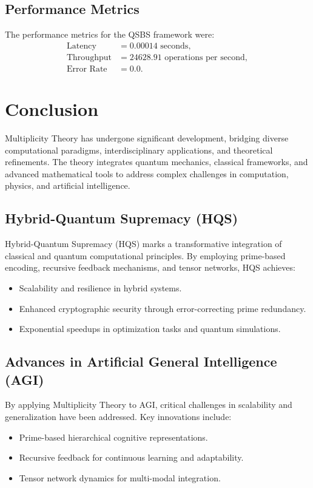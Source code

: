 \documentclass{article}
\theoremstyle{plain}
\begin{document}
\subsection{Performance Metrics}
The performance metrics for the QSBS framework were:
\begin{align*}
\text{Latency} &= 0.00014 \text{ seconds}, \\
\text{Throughput} &= 24628.91 \text{ operations per second}, \\
\text{Error Rate} &= 0.0.
\end{align*}

\section{Conclusion}
Multiplicity Theory has undergone significant development, bridging diverse computational paradigms, interdisciplinary applications, and theoretical refinements. The theory integrates quantum mechanics, classical frameworks, and advanced mathematical tools to address complex challenges in computation, physics, and artificial intelligence.

\subsection{Hybrid-Quantum Supremacy (HQS)}
Hybrid-Quantum Supremacy (HQS) marks a transformative integration of classical and quantum computational principles. By employing prime-based encoding, recursive feedback mechanisms, and tensor networks, HQS achieves:
\begin{itemize}
    \item Scalability and resilience in hybrid systems.
    \item Enhanced cryptographic security through error-correcting prime redundancy.
    \item Exponential speedups in optimization tasks and quantum simulations.
\end{itemize}

\subsection{Advances in Artificial General Intelligence (AGI)}
By applying Multiplicity Theory to AGI, critical challenges in scalability and generalization have been addressed. Key innovations include:
\begin{itemize}
    \item Prime-based hierarchical cognitive representations.
    \item Recursive feedback for continuous learning and adaptability.
    \item Tensor network dynamics for multi-modal integration.
\end{itemize}
\end{document}
